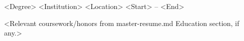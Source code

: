 
\begin{cventries}

  \cventry
    {<Degree>}
    {<Institution>}
    {<Location>}
    {<Start> -- <End>}
    {
      \begin{cvitems}
        \item {<Relevant coursework/honors from master-resume.md Education section, if any.>}
      \end{cvitems}
    }

\end{cventries}
